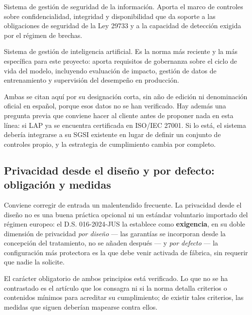 \begin{description}[leftmargin=0pt,style=unboxed,itemsep=0.35em]
  \item[ISO/IEC 27001.] Sistema de gestión de seguridad de la
    información. Aporta el marco de controles sobre confidencialidad,
    integridad y disponibilidad que da soporte a las obligaciones de
    seguridad de la Ley 29733 y a la capacidad de detección exigida por
    el régimen de brechas.
  \item[ISO/IEC 42001.] Sistema de gestión de inteligencia artificial.
    Es la norma más reciente y la más específica para este proyecto:
    aporta requisitos de gobernanza sobre el ciclo de vida del modelo,
    incluyendo evaluación de impacto, gestión de datos de entrenamiento y
    supervisión del desempeño en producción.
\end{description}

Ambas se citan aquí por su designación corta, sin año de edición ni
denominación oficial en español, porque esos datos no se han verificado.
Hay además una pregunta previa que conviene hacer al cliente antes de
proponer nada en esta línea: si LAP ya se encuentra certificada en
ISO/IEC 27001. Si lo está, el sistema debería integrarse a su SGSI
existente en lugar de definir un conjunto de controles propio, y la
estrategia de cumplimiento cambia por completo.

\subsection{Privacidad desde el diseño y por defecto: obligación y medidas}
\label{sec:privacidad-diseno}

Conviene corregir de entrada un malentendido frecuente. La privacidad
desde el diseño no es una buena práctica opcional ni un estándar
voluntario importado del régimen europeo: el D.S. 016-2024-JUS la
establece como \textbf{exigencia}, en su doble dimensión de privacidad
\emph{por diseño} --- las garantías se incorporan desde la concepción del
tratamiento, no se añaden después --- y \emph{por defecto} --- la
configuración más protectora es la que debe venir activada de fábrica,
sin requerir que nadie la solicite.

El carácter obligatorio de ambos principios está verificado. Lo que no se
ha contrastado es el artículo que los consagra ni si la norma detalla
criterios o contenidos mínimos para acreditar su cumplimiento; de existir
tales criterios, las medidas que siguen deberían mapearse contra ellos.

